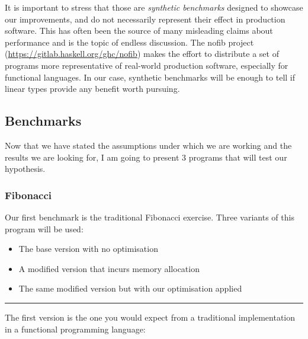 \documentclass[
]{article}
\providecommand{\tightlist}{%
  \setlength{\itemsep}{0pt}\setlength{\parskip}{0pt}}
\begin{document}
It is important to stress that those are \emph{synthetic benchmarks}
designed to showcase our improvements, and do not necessarily represent
their effect in production software. This has often been the source of
many misleading claims about performance and is the topic of endless
discussion. The nofib\cite{nofib} project
(\url{https://gitlab.haskell.org/ghc/nofib}) makes the effort to
distribute a set of programs more representative of real-world
production software, especially for functional languages. In our case,
synthetic benchmarks will be enough to tell if linear types provide any
benefit worth pursuing.

\hypertarget{benchmarks}{%
\subsection{Benchmarks}\label{benchmarks}}

Now that we have stated the assumptions under which we are working and
the results we are looking for, I am going to present 3 programs that
will test our hypothesis.

\hypertarget{fibonacci}{%
\subsubsection{Fibonacci}\label{fibonacci}}

Our first benchmark is the traditional Fibonacci exercise. Three
variants of this program will be used:

\begin{itemize}
\tightlist
\item
  The base version with no optimisation
\item
  A modified version that incurs memory allocation
\item
  The same modified version but with our optimisation applied
\end{itemize}

\begin{center}\rule{0.5\linewidth}{0.5pt}\end{center}

The first version is the one you would expect from a traditional
implementation in a functional programming language:
\end{document}
